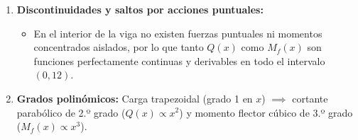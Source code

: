 {\begin{enumerate}
\begin{itemize}
              \end{itemize}

        \item \textbf{Discontinuidades y saltos por acciones puntuales:}

              \begin{itemize}

                  \item En el interior de la viga no existen fuerzas puntuales ni momentos concentrados aislados, por lo que tanto $Q(x)$ como $M_f(x)$ son funciones perfectamente continuas y derivables en todo el intervalo $(0, 12)$.

              \end{itemize}

        \item \textbf{Grados polinómicos:} Carga trapezoidal (grado 1 en $x$) $\implies$ cortante parabólico de 2.º grado ($Q(x) \propto x^2$) y momento flector cúbico de 3.º grado ($M_f(x) \propto x^3$).

    \end{enumerate}

}






